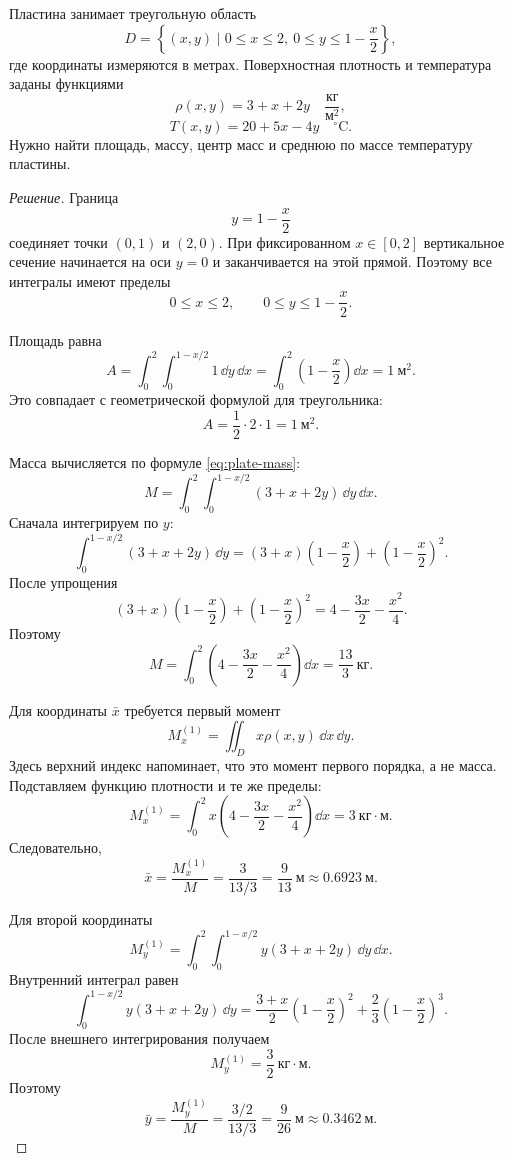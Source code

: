 \begin{problem}
Пластина занимает треугольную область
\[
D
=
\left\{
(x,y)
\mid
0\leq x\leq2,
\ 0\leq y\leq1-\frac{x}{2}
\right\},
\]
где координаты измеряются в метрах. Поверхностная плотность и температура заданы функциями
\[
\rho(x,y)=3+x+2y
\quad\frac{\text{кг}}{\text{м}^2},
\]
\[
T(x,y)=20+5x-4y
\quad{}^{\circ}\text{C}.
\]
Нужно найти площадь, массу, центр масс и среднюю по массе температуру пластины.
\end{problem}

\begin{proof}[Решение]
Граница
\[
y=1-\frac{x}{2}
\]
соединяет точки $(0,1)$ и $(2,0)$. При фиксированном $x\in[0,2]$ вертикальное сечение начинается на оси $y=0$ и заканчивается на этой прямой. Поэтому все интегралы имеют пределы
\[
0\leq x\leq2,
\qquad
0\leq y\leq1-\frac{x}{2}.
\]

Площадь равна
\[
A
=
\int_0^2\int_0^{1-x/2}1\,\dd y\,\dd x
=
\int_0^2\left(1-\frac{x}{2}\right)\dd x
=1\ \text{м}^2.
\]
Это совпадает с геометрической формулой для треугольника:
\[
A=\frac12\cdot2\cdot1=1\ \text{м}^2.
\]

Масса вычисляется по формуле \eqref{eq:plate-mass}:
\[
M
=
\int_0^2\int_0^{1-x/2}(3+x+2y)\,\dd y\,\dd x.
\]
Сначала интегрируем по $y$:
\[
\int_0^{1-x/2}(3+x+2y)\,\dd y
=
(3+x)\left(1-\frac{x}{2}\right)
+
\left(1-\frac{x}{2}\right)^2.
\]
После упрощения
\[
(3+x)\left(1-\frac{x}{2}\right)
+
\left(1-\frac{x}{2}\right)^2
=
4-\frac{3x}{2}-\frac{x^2}{4}.
\]
Поэтому
\[
M
=
\int_0^2
\left(
4-\frac{3x}{2}-\frac{x^2}{4}
\right)\dd x
=
\frac{13}{3}\ \text{кг}.
\]

Для координаты $\bar x$ требуется первый момент
\[
M_x^{(1)}
=
\iint_Dx\rho(x,y)\,\dd x\,\dd y.
\]
Здесь верхний индекс напоминает, что это момент первого порядка, а не масса. Подставляем функцию плотности и те же пределы:
\[
M_x^{(1)}
=
\int_0^2
x\left(
4-\frac{3x}{2}-\frac{x^2}{4}
\right)\dd x
=3\ \text{кг}\cdot\text{м}.
\]
Следовательно,
\[
\bar x
=
\frac{M_x^{(1)}}{M}
=
\frac{3}{13/3}
=
\frac{9}{13}\ \text{м}
\approx0.6923\ \text{м}.
\]

Для второй координаты
\[
M_y^{(1)}
=
\int_0^2
\int_0^{1-x/2}
 y(3+x+2y)\,\dd y\,\dd x.
\]
Внутренний интеграл равен
\[
\int_0^{1-x/2}
 y(3+x+2y)\,\dd y
=
\frac{3+x}{2}
\left(1-\frac{x}{2}\right)^2
+
\frac{2}{3}
\left(1-\frac{x}{2}\right)^3.
\]
После внешнего интегрирования получаем
\[
M_y^{(1)}=\frac32\ \text{кг}\cdot\text{м}.
\]
Поэтому
\[
\bar y
=
\frac{M_y^{(1)}}{M}
=
\frac{3/2}{13/3}
=
\frac{9}{26}\ \text{м}
\approx0.3462\ \text{м}.
\]


\end{proof}
